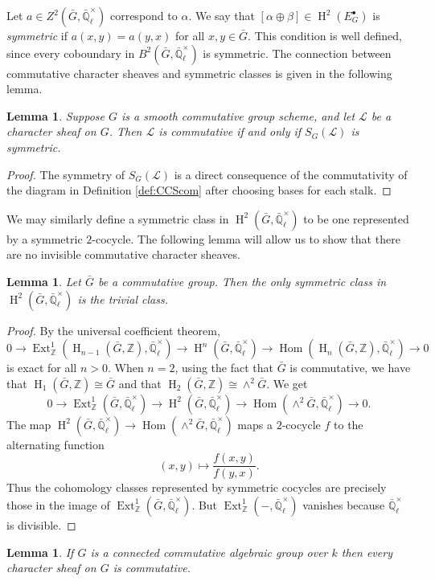 \documentclass[10pt]{amsart}
\theoremstyle{plain}
\newtheorem{lemma}[theorem]{Lemma}
\theoremstyle{definition}
\newcommand{\ZZ}{{\mathbb{Z}}}
\newcommand{\EE}{\mathbb{\bar Q}_\ell}
\newcommand{\Fq}{k}
\newcommand{\EEx}{\EE^\times}
\DeclareMathOperator{\Hom}{Hom}
\DeclareMathOperator{\Ext}{Ext}
\DeclareMathOperator{\Hh}{H}
\newcommand{\cs}[1]{{\mathcal{#1}}}
\newcommand{\bG}{\bar{G}}
\begin{document}
Let $a \in Z^2(\bG, \EEx)$ correspond to $\alpha$.  We say that $[\alpha \oplus \beta] \in \Hh^2(E_G^\bullet)$
is \emph{symmetric} if $a(x,y) = a(y,x)$ for all $x,y \in \bG$.  This condition is well defined, since every
coboundary in $B^2(\bG, \EEx)$ is symmetric.  The connection between commutative character sheaves
and symmetric classes is given in the following lemma.

\begin{lemma} \label{lem:symccslink}
Suppose $G$ is a smooth commutative group scheme, and let $\cs{L}$ be a character sheaf on $G$.
Then $\cs{L}$ is commutative if and only if $S_G(\cs{L})$ is symmetric.
\end{lemma}
\begin{proof}
The symmetry of $S_G(\cs{L})$ is a direct consequence of the commutativity of the diagram in Definition \ref{def:CCScom}
after choosing bases for each stalk.
\end{proof}

We may similarly define a symmetric class in $\Hh^2(\bG, \EEx)$ to be one represented by a symmetric $2$-cocycle.
The following lemma will allow us to show that there are no invisible commutative character sheaves.

\begin{lemma} \label{lem:symtriv}
Let $\bG$ be a commutative group.  Then the only symmetric class in $\Hh^2(\bG, \EEx)$ is the trivial class.
\end{lemma}

\begin{proof}
By the universal coefficient theorem,
\[
0 \to \Ext^1_\ZZ(\Hh_{n-1}(\bG, \ZZ), \EEx) \to \Hh^n(\bG, \EEx) \to \Hom(\Hh_n(\bG, \ZZ), \EEx) \to 0
\]
is exact for all $n > 0$.  When $n = 2$, using the fact that $\bG$ is commutative, we have that $\Hh_1(\bG, \ZZ) \cong \bG$
and that $\Hh_2(\bG, \ZZ) \cong \wedge^2 \bG$. We get
\[
0 \to \Ext^1_\ZZ(\bG, \EEx) \to \Hh^2(\bG, \EEx) \to \Hom(\wedge^2 \bG, \EEx) \to 0.
\]
The map $\Hh^2(\bG, \EEx) \to \Hom(\wedge^2 \bG, \EEx)$ maps a $2$-cocycle $f$ to the alternating function
\[
(x,y) \mapsto \frac{f(x,y)}{f(y,x)}.
\]
Thus the cohomology classes represented by symmetric cocycles are precisely those in the image of $\Ext^1_\ZZ(\bG, \EEx)$.
But $\Ext^1_\ZZ(-, \EEx)$ vanishes because $\EEx$ is divisible.
\end{proof}

\begin{lemma} \label{lem:conncomm}
If $G$ is a connected commutative algebraic group over $\Fq$ then every character sheaf on $G$ is commutative.
\end{lemma}
\end{document}
